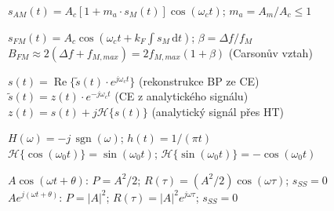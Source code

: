 \documentclass[12pt,a4paper]{article}
\newcommand{\dd}{\mathrm{d}}
\begin{document}
\begin{matBox}[AM modulace]
$s_{AM}(t) = A_c[1 + m_a\cdot s_M(t)]\cos(\omega_c t)$; \quad $m_a = A_m/A_c \leq 1$
\end{matBox}

\begin{matBox}[FM modulace]
$s_{FM}(t) = A_c\cos\!\left(\omega_c t + k_F\int s_M\,\dd t\right)$; \quad $\beta = \Delta f/f_M$\\
$B_{FM} \approx 2(\Delta f + f_{M,max}) = 2f_{M,max}(1+\beta)$ \hfill (Carsonův vztah)
\end{matBox}

\begin{matBox}
$s(t) = \operatorname{Re}\{\tilde{s}(t)\cdot e^{j\omega_c t}\}$ \hfill (rekonstrukce BP ze CE)\\
$\tilde{s}(t) = z(t)\cdot e^{-j\omega_c t}$ \hfill (CE z analytického signálu)\\
$z(t) = s(t) + j\mathcal{H}\{s(t)\}$ \hfill (analytický signál přes HT)
\end{matBox}

\begin{matBox}
$H(\omega) = -j\,\operatorname{sgn}(\omega)$; \quad $h(t) = 1/(\pi t)$\\
$\mathcal{H}\{\cos(\omega_0 t)\} = \sin(\omega_0 t)$; \quad $\mathcal{H}\{\sin(\omega_0 t)\} = -\cos(\omega_0 t)$
\end{matBox}

\begin{matBox}
$A\cos(\omega t+\theta)$: $P = A^2/2$; $R(\tau) = (A^2/2)\cos(\omega\tau)$; $s_{SS}=0$\\
$Ae^{j(\omega t+\theta)}$: $P = |A|^2$; $R(\tau) = |A|^2 e^{j\omega\tau}$; $s_{SS}=0$
\end{matBox}
\end{document}
